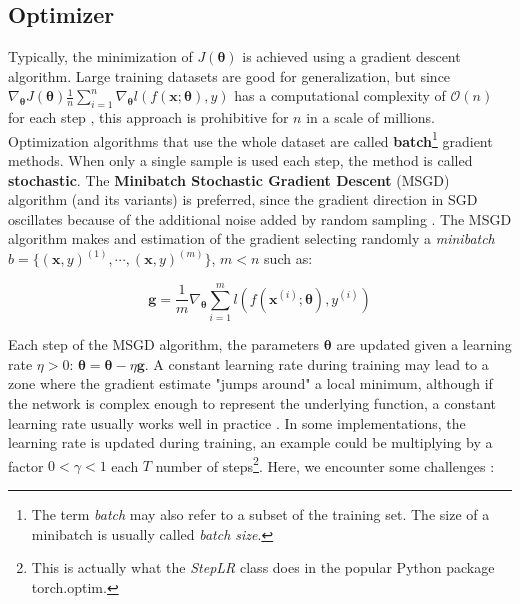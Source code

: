 \subsection{Optimizer}
\label{sec:optimizer}
Typically, the minimization of $J(\boldsymbol{\theta})$ is achieved using a gradient descent algorithm. Large training datasets are good for generalization, but since $\nabla_{\boldsymbol{\theta}} J (\boldsymbol{\theta}) \frac{1}{n}\sum_{i=1}^n \nabla_{\boldsymbol{\theta}} l(f(\mathbf{x}; \boldsymbol{\theta}), y)$ has a computational complexity of $\mathcal{O}(n)$ for each step \cite{goodfellow2016}, this approach is prohibitive for $n$ in a scale of millions. Optimization algorithms that use the whole dataset are called \textbf{batch}\footnote{The term \textit{batch} may also refer to a subset of the training set. The size of a minibatch is usually called \textit{batch size}.} gradient methods.
When only a single sample is used each step, the method is called \textbf{stochastic}. The \textbf{Minibatch Stochastic Gradient Descent} (MSGD) algorithm (and its variants) is preferred, since the gradient direction in SGD oscillates because of the additional noise added by random sampling \cite{sun2019}.
The MSGD algorithm makes and estimation of the gradient selecting randomly a \textit{minibatch} $b = \{(\mathbf{x}, y)^{(1)},\cdots, (\mathbf{x}, y)^{(m)}\}$, $m<n$ such as:

\begin{equation}
    \label{eqn:gradient_estimate}
    \mathbf{g} = \frac{1}{m} \nabla_{\boldsymbol{\theta}} \sum_{i=1}^m l(f(\mathbf{x}^{(i)}; \boldsymbol{\theta}), y^{(i)})
\end{equation}

Each step of the MSGD algorithm, the parameters $\boldsymbol{\theta}$ are updated given a learning rate $\eta > 0$: $\boldsymbol{\theta} = \boldsymbol{\theta} - \eta \mathbf{g}$. A constant learning rate during training may lead to a zone where the gradient estimate "jumps around" a local minimum, although if the network is complex enough to represent the underlying function, a constant learning rate usually works well in practice \cite{sun2019a}. In some implementations, the learning rate is updated during training, an example could be multiplying by a factor $0<\gamma<1$ each $T$ number of steps\footnote{This is actually what the \textit{StepLR} class does in the popular Python package torch.optim.}.
Here, we encounter some challenges \cite{ruder2017}:

